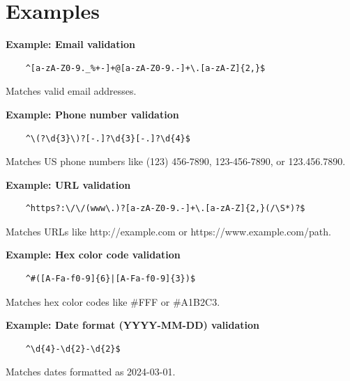 \section{Examples}

\textbf{Example: Email validation}

\begin{verbatim}
    ^[a-zA-Z0-9._%+-]+@[a-zA-Z0-9.-]+\.[a-zA-Z]{2,}$
\end{verbatim}

Matches valid email addresses.

\textbf{Example: Phone number validation}

\begin{verbatim}
    ^\(?\d{3}\)?[-.]?\d{3}[-.]?\d{4}$
\end{verbatim}

Matches US phone numbers like (123) 456-7890, 123-456-7890, or 123.456.7890.

\textbf{Example: URL validation}

\begin{verbatim}
    ^https?:\/\/(www\.)?[a-zA-Z0-9.-]+\.[a-zA-Z]{2,}(/\S*)?$
\end{verbatim}

Matches URLs like http://example.com or https://www.example.com/path.

\textbf{Example: Hex color code validation}

\begin{verbatim}
    ^#([A-Fa-f0-9]{6}|[A-Fa-f0-9]{3})$
\end{verbatim}

Matches hex color codes like \#FFF or \#A1B2C3.

\textbf{Example: Date format (YYYY-MM-DD) validation}

\begin{verbatim}
    ^\d{4}-\d{2}-\d{2}$
\end{verbatim}

Matches dates formatted as 2024-03-01.
